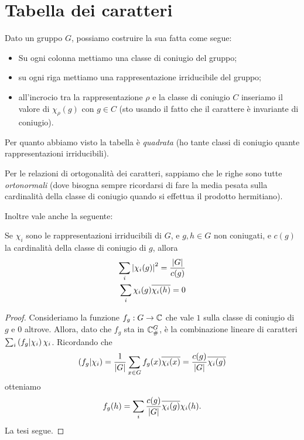 \section{Tabella dei caratteri}

Dato un gruppo $G$, possiamo costruire la sua  fatta come segue:
\begin{itemize}
  \item Su ogni colonna mettiamo una classe di coniugio del gruppo;
  \item su ogni riga mettiamo una rappresentazione irriducibile del gruppo;
  \item all'incrocio tra la rappresentazione $\rho$ e la classe di coniugio $C$ inseriamo il valore di $\chi_\rho(g)$ con $g\in C$ (sto usando il fatto che il carattere è invariante di coniugio).
\end{itemize}

Per quanto abbiamo visto la tabella è \emph{quadrata} (ho tante classi di coniugio quante rappresentazioni irriducibili).

Per le relazioni di ortogonalità dei caratteri, sappiamo che le righe sono tutte \emph{ortonormali} (dove bisogna sempre ricordarsi di fare la media pesata sulla cardinalità della classe di coniugio quando si effettua il prodotto hermitiano).

Inoltre vale anche la seguente:
\begin{myprop}
  Se $\chi_i$ sono le rappresentazioni irriducibili di $G$, e $g,h\in G$ non coniugati, e $c(g)$ la cardinalità della classe di coniugio di $g$, allora 
  \begin{align*}
    \sum_i \left|\chi_i(g)\right|^2 = \frac {\left|G\right|}{c(g)}\\
    \sum_i \chi_i(g)\overline{\chi_i(h)} = 0
  \end{align*}
\end{myprop}

\begin{proof}
	Consideriamo la funzione $f_g: G \rightarrow \mathbb C$ che vale $1$ sulla classe di coniugio di $g$ e $0$ altrove.
	Allora, dato che $f_g$ sta in $\mathbb C^{G}_\#$, è la combinazione lineare di caratteri $\sum_i \left(f_g | \chi_i\right)\chi_i$. Ricordando che 
	\[
		\left(f_g | \chi_i\right) = \frac1{\left|G\right|}\sum_{x\in G}f_g(x)\overline{\chi_i(x)}=\frac{c(g)}{\left|G\right|}\overline{\chi_i(g)}
	\]
	otteniamo
	\[
			f_g(h) = \sum_i\frac{c(g)}{\left|G\right|}\overline{\chi_i(g)}\chi_i(h).
	\]
	La tesi segue.
\end{proof}


